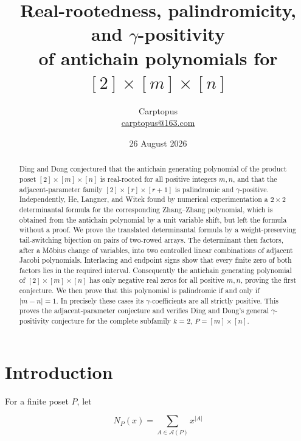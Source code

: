\documentclass[11pt]{article}
\title{Real-rootedness, palindromicity, and $\gamma$-positivity\\
of antichain polynomials for
\texorpdfstring{$[2]\times[m]\times[n]$}{[2] x [m] x [n]}}
\author{Carptopus\\\href{mailto:carptopus@163.com}{carptopus@163.com}}
\date{26 August 2026}
\numberwithin{equation}{section}
\begin{document}
\maketitle

\begin{center}
\end{center}

\begin{abstract}


Ding and Dong conjectured that the antichain generating polynomial of the product
poset $[2]\times[m]\times[n]$ is real-rooted for all positive integers $m,n$,
and that the adjacent-parameter family $[2]\times[r]\times[r+1]$ is
palindromic and $\gamma$-positive.
Independently, He, Langner, and Witek found by numerical experimentation a
$2\times2$ determinantal formula for the corresponding Zhang--Zhang polynomial,
which is obtained from the antichain polynomial by a unit variable shift, but
left the formula without a proof. We prove the translated determinantal formula
by a weight-preserving tail-switching
bijection on pairs of two-rowed arrays. The determinant then factors, after a
Möbius change of variables, into two controlled linear combinations of adjacent
Jacobi polynomials. Interlacing and endpoint signs show that every finite zero of
both factors lies in the required interval. Consequently the antichain generating
polynomial of $[2]\times[m]\times[n]$ has only negative real zeros for all positive
$m,n$, proving the first conjecture. We then prove that this polynomial is
palindromic if and only if $|m-n|=1$. In precisely these cases its
$\gamma$-coefficients are all strictly positive. This proves the
adjacent-parameter conjecture and verifies Ding and Dong's general
$\gamma$-positivity conjecture for the complete subfamily
$k=2$, $P=[m]\times[n]$.

\end{abstract}

\section{Introduction}


For a finite poset $P$, let

\nopagebreak[4]
\[
N_P(x)=\sum_{A\in\mathcal A(P)}x^{|A|}
\]
\end{document}
